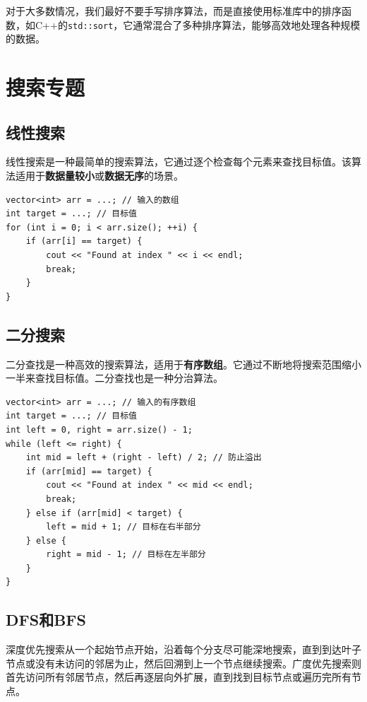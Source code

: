 \documentclass{article}
\begin{document}
对于大多数情况，我们最好不要手写排序算法，而是直接使用标准库中的排序函数，如C++的\texttt{std::sort}，它通常混合了多种排序算法，能够高效地处理各种规模的数据。

\section{搜索专题}

\subsection{线性搜索}

线性搜索是一种最简单的搜索算法，它通过逐个检查每个元素来查找目标值。该算法适用于\textbf{数据量较小}或\textbf{数据无序}的场景。

\begin{lstlisting}
vector<int> arr = ...; // 输入的数组
int target = ...; // 目标值
for (int i = 0; i < arr.size(); ++i) {
    if (arr[i] == target) {
        cout << "Found at index " << i << endl;
        break;
    }
}
\end{lstlisting}

\subsection{二分搜索}

二分查找是一种高效的搜索算法，适用于\textbf{有序数组}。它通过不断地将搜索范围缩小一半来查找目标值。二分查找也是一种分治算法。

\begin{lstlisting}
vector<int> arr = ...; // 输入的有序数组
int target = ...; // 目标值
int left = 0, right = arr.size() - 1;
while (left <= right) {
    int mid = left + (right - left) / 2; // 防止溢出
    if (arr[mid] == target) {
        cout << "Found at index " << mid << endl;
        break;
    } else if (arr[mid] < target) {
        left = mid + 1; // 目标在右半部分
    } else {
        right = mid - 1; // 目标在左半部分
    }
}
\end{lstlisting}

\subsection{DFS和BFS}

深度优先搜索从一个起始节点开始，沿着每个分支尽可能深地搜索，直到到达叶子节点或没有未访问的邻居为止，然后回溯到上一个节点继续搜索。广度优先搜索则首先访问所有邻居节点，然后再逐层向外扩展，直到找到目标节点或遍历完所有节点。
\end{document}
